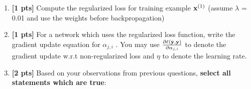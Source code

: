 \begin{enumerate}
\begin{enumerate}
    \item \textbf{[1 pts]} Compute the regularized loss for training example $\mathbf{x}^{(1)}$ (assume $\lambda$ = 0.01 and use the weights before backpropagation)
    \begin{tcolorbox}[fit,height=1cm, width=2cm, blank, borderline={1pt}{-2pt}]
    \end{tcolorbox}
    
     \item \textbf{[1 pts]} For a network which uses the regularized loss function, write the gradient update equation for $\alpha_{j,i}$ . You may use $\frac{\partial \ell(\hat{\mathbf{y}},\mathbf{y})}{\partial \alpha_{j,i}}$ to denote the gradient update w.r.t non-regularized loss and $\eta$ to denote the learning rate.
    \begin{tcolorbox}[fit,height=3cm, width=15cm, blank, borderline={1pt}{-2pt}]
    \end{tcolorbox}
    
    
    \item \textbf{[2 pts]} Based on your observations from previous questions, \textbf{select all statements which are true}:
    
\end{enumerate}
\end{enumerate}